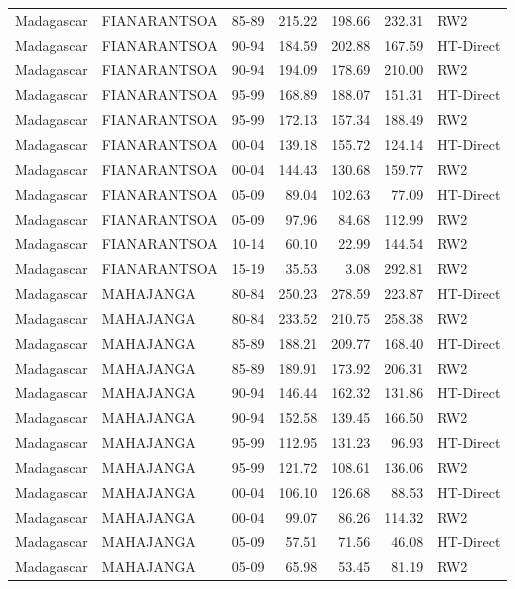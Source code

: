 \begin{longtable}{lllrrrl}
  Madagascar & FIANARANTSOA & 85-89 & 215.22 & 198.66 & 232.31 & RW2 \\ 
  Madagascar & FIANARANTSOA & 90-94 & 184.59 & 202.88 & 167.59 & HT-Direct \\ 
  Madagascar & FIANARANTSOA & 90-94 & 194.09 & 178.69 & 210.00 & RW2 \\ 
  Madagascar & FIANARANTSOA & 95-99 & 168.89 & 188.07 & 151.31 & HT-Direct \\ 
  Madagascar & FIANARANTSOA & 95-99 & 172.13 & 157.34 & 188.49 & RW2 \\ 
  Madagascar & FIANARANTSOA & 00-04 & 139.18 & 155.72 & 124.14 & HT-Direct \\ 
  Madagascar & FIANARANTSOA & 00-04 & 144.43 & 130.68 & 159.77 & RW2 \\ 
  Madagascar & FIANARANTSOA & 05-09 & 89.04 & 102.63 & 77.09 & HT-Direct \\ 
  Madagascar & FIANARANTSOA & 05-09 & 97.96 & 84.68 & 112.99 & RW2 \\ 
  Madagascar & FIANARANTSOA & 10-14 & 60.10 & 22.99 & 144.54 & RW2 \\ 
  Madagascar & FIANARANTSOA & 15-19 & 35.53 & 3.08 & 292.81 & RW2 \\ 
  Madagascar & MAHAJANGA & 80-84 & 250.23 & 278.59 & 223.87 & HT-Direct \\ 
  Madagascar & MAHAJANGA & 80-84 & 233.52 & 210.75 & 258.38 & RW2 \\ 
  Madagascar & MAHAJANGA & 85-89 & 188.21 & 209.77 & 168.40 & HT-Direct \\ 
  Madagascar & MAHAJANGA & 85-89 & 189.91 & 173.92 & 206.31 & RW2 \\ 
  Madagascar & MAHAJANGA & 90-94 & 146.44 & 162.32 & 131.86 & HT-Direct \\ 
  Madagascar & MAHAJANGA & 90-94 & 152.58 & 139.45 & 166.50 & RW2 \\ 
  Madagascar & MAHAJANGA & 95-99 & 112.95 & 131.23 & 96.93 & HT-Direct \\ 
  Madagascar & MAHAJANGA & 95-99 & 121.72 & 108.61 & 136.06 & RW2 \\ 
  Madagascar & MAHAJANGA & 00-04 & 106.10 & 126.68 & 88.53 & HT-Direct \\ 
  Madagascar & MAHAJANGA & 00-04 & 99.07 & 86.26 & 114.32 & RW2 \\ 
  Madagascar & MAHAJANGA & 05-09 & 57.51 & 71.56 & 46.08 & HT-Direct \\ 
  Madagascar & MAHAJANGA & 05-09 & 65.98 & 53.45 & 81.19 & RW2 \\ 

\end{longtable}
